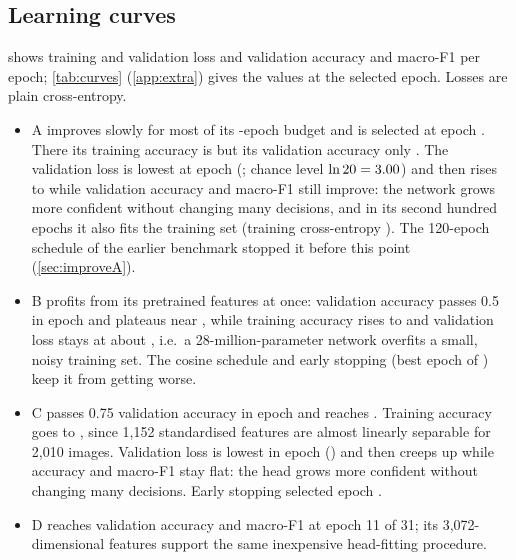 \documentclass[11pt,a4paper]{article}
\begin{document}
\begin{table}[!tbp]
\centering\footnotesize
\caption{Test-set metrics ($n=\nTest$, same images for all models). Bold:
best main model. CI: 95\% percentile bootstrap (2,000 resamples).}
\label{tab:test}
\setlength{\tabcolsep}{2pt}

\end{table}

\begin{table}[!tbp]
\centering\footnotesize
\caption{Paired comparisons on the same \nTest test images: accuracy difference $\Delta$ as a proportion
($\times100$ = percentage points, as in the text), paired-bootstrap interval, discordant counts, exact McNemar test.}
\label{tab:pairwise}

\end{table}

\subsection{Learning curves}
 shows training and validation loss and validation accuracy and macro-F1 per epoch;
\cref{tab:curves} (\cref{app:extra}) gives the values at the selected epoch. Losses are plain cross-entropy.
\begin{itemize}[leftmargin=*]
\item A improves slowly for most of its \maxEpochsA-epoch budget and is selected at epoch \bestA. There its
training accuracy is \trainAccA but its validation accuracy only \valAccA. The validation loss is lowest at epoch
\minValCEepA (\minValCEA; chance level $\ln 20=3.00$) and then rises to \valCEA while validation accuracy and
macro-F1 still improve: the network grows more confident without changing many decisions, and in its second
hundred epochs it also fits the training set (training cross-entropy \trainCEA). The 120-epoch schedule of the
earlier benchmark stopped it before this point (\cref{sec:improveA}).
\item B profits from its pretrained features at once: validation accuracy passes 0.5 in epoch \epHalfB and
plateaus near \valAccB, while training accuracy rises to \finalTrainAccB and validation loss stays at about \valCEB,
i.e.\ a 28-million-parameter network overfits a small, noisy training set. The cosine schedule and early stopping
(best epoch \bestB of \epochsB) keep it from getting worse.
\item C passes 0.75 validation accuracy in epoch \epTqC and reaches \valAccC. Training accuracy goes to
\finalTrainAccC, since 1,152 standardised features are almost linearly separable for 2,010 images. Validation loss is
lowest in epoch \minValCEepC (\minValCEC) and then creeps up while accuracy and macro-F1 stay flat: the head grows more
confident without changing many decisions. Early stopping selected epoch \bestC.
\item D reaches validation accuracy \valAccD{} and macro-F1 \valFoneD{} at epoch 11 of 31; its 3,072-dimensional features support the same inexpensive head-fitting procedure.
\end{itemize}
\end{document}
